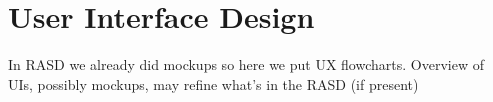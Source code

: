 \section{User Interface Design}
In RASD we already did mockups so here we put UX flowcharts.
Overview of UIs, possibly mockups, may refine what’s in the RASD (if present)